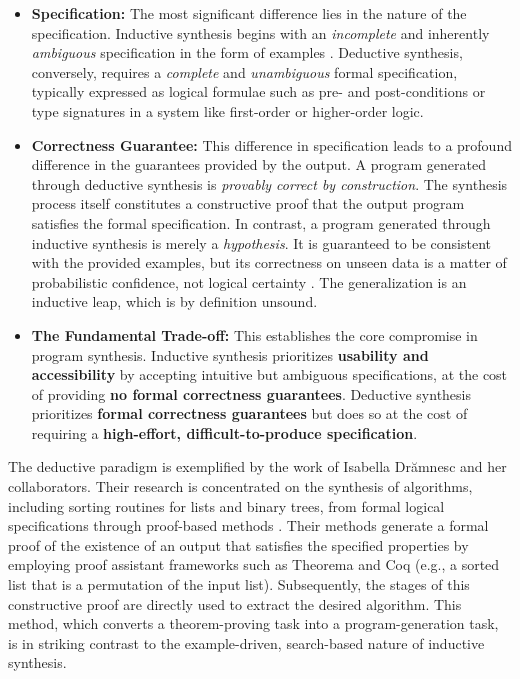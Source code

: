 \documentclass[12pt, a4paper]{report}
\begin{document}
\begin{itemize}
    \item \textbf{Specification:} The most significant difference lies in the nature of the specification. Inductive synthesis begins with an \textit{incomplete} and inherently \textit{ambiguous} specification in the form of examples \citep{gulwani2012dimensions}. Deductive synthesis, conversely, requires a \textit{complete} and \textit{unambiguous} formal specification, typically expressed as logical formulae such as pre- and post-conditions or type signatures in a system like first-order or higher-order logic.
    \item \textbf{Correctness Guarantee:} This difference in specification leads to a profound difference in the guarantees provided by the output. A program generated through deductive synthesis is \textit{provably correct by construction}. The synthesis process itself constitutes a constructive proof that the output program satisfies the formal specification. In contrast, a program generated through inductive synthesis is merely a \textit{hypothesis}. It is guaranteed to be consistent with the provided examples, but its correctness on unseen data is a matter of probabilistic confidence, not logical certainty \citep{summers1977methodology}. The generalization is an inductive leap, which is by definition unsound.
    \item \textbf{The Fundamental Trade-off:} This establishes the core compromise in program synthesis. Inductive synthesis prioritizes \textbf{usability and accessibility} by accepting intuitive but ambiguous specifications, at the cost of providing \textbf{no formal correctness guarantees}. Deductive synthesis prioritizes \textbf{formal correctness guarantees} but does so at the cost of requiring a \textbf{high-effort, difficult-to-produce specification}.
\end{itemize}

The deductive paradigm is exemplified by the work of Isabella Drămnesc and her collaborators.  Their research is concentrated on the synthesis of algorithms, including sorting routines for lists and binary trees, from formal logical specifications through proof-based methods \citep{dramnesc2005proof, dramnesc2006synthesis}.  Their methods generate a formal proof of the existence of an output that satisfies the specified properties by employing proof assistant frameworks such as Theorema and Coq (e.g., a sorted list that is a permutation of the input list).  Subsequently, the stages of this constructive proof are directly used to extract the desired algorithm.  This method, which converts a theorem-proving task into a program-generation task, is in striking contrast to the example-driven, search-based nature of inductive synthesis.
\end{document}
